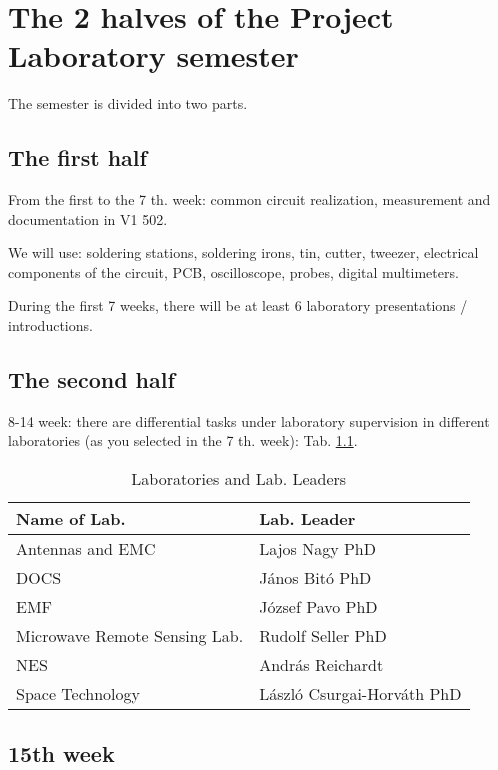 \chapter{The 2 halves of the Project Laboratory semester}

The semester is divided into two parts.

\section{The first half}

From the first to the 7 th. week: common circuit realization, measurement and documentation in V1 502.

We will use: soldering stations, soldering irons, tin, cutter, tweezer, electrical components of the circuit, PCB, oscilloscope, probes, digital multimeters.

During the first 7 weeks, there will be at least 6 laboratory presentations / introductions.

\section{The second half}

8-14 week: there are differential tasks under laboratory supervision in different laboratories (as you selected in the 7 th. week): Tab. \ref{tab:lab}.

\begin{table}[hb]
        \footnotesize
        \centering
        \caption{Laboratories and Lab. Leaders}
        \begin{tabular}{ | l | l |}
        \hline
        Name of Lab. & Lab. Leader\\
        \hline
 		Antennas and EMC & Lajos Nagy PhD \\
 		DOCS & János Bitó PhD \\
 		EMF & József Pavo PhD\\
 		Microwave Remote Sensing Lab. & Rudolf Seller PhD\\
 		NES & András Reichardt \\
 		Space Technology & László Csurgai-Horváth PhD\\
        \hline
        \end{tabular}
        \label{tab:lab}
\end{table}

\section{15th week}


